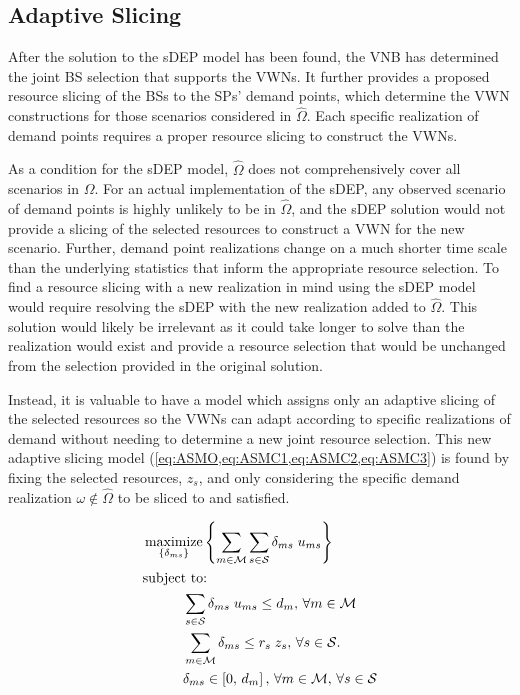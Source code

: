 \documentclass[12pt,dvipsnames]{report}
\DeclareMathOperator*{\argmax}{maximize}
\begin{document}
\subsection{Adaptive Slicing} \label{subsec:dep_slicing}

After the solution to the sDEP model has been found, the VNB has determined the joint BS selection that supports the VWNs.  It further provides a proposed resource slicing of the BSs to the SPs' demand points, which determine the VWN constructions for those scenarios considered in $\hat{\Omega}$.  Each specific realization of demand points requires a proper resource slicing to construct the VWNs.

As a condition for the sDEP model, $\hat{\Omega}$ does not comprehensively cover all scenarios in $\Omega$.  For an actual implementation of the sDEP, any observed scenario of demand points is highly unlikely to be in $\hat{\Omega}$, and the sDEP solution would not provide a slicing of the selected resources to construct a VWN for the new scenario.  Further, demand point realizations change on a much shorter time scale than the underlying statistics that inform the appropriate resource selection.  To find a resource slicing with a new realization in mind using the sDEP model would require resolving the sDEP with the new realization added to $\hat{\Omega}$.  This solution would likely be irrelevant as it could take longer to solve than the realization would exist and provide a resource selection that would be unchanged from the selection provided in the original solution.

Instead, it is valuable to have a model which assigns only an adaptive slicing of the selected resources so the VWNs can adapt according to specific realizations of demand without needing to determine a new joint resource selection.  This new adaptive slicing model (\cref{eq:ASMO,eq:ASMC1,eq:ASMC2,eq:ASMC3}) is found by fixing the selected resources, $z_s$, and only considering the specific demand realization $\omega \notin \hat{\Omega}$ to be sliced to and satisfied.

\begin{tcolorbox}[floatplacement = ht, float, title = Adaptive Slicing Model]
	\begin{align}
		& \argmax_{\left\{ \delta_{ms} \right\}} \left\{ \sum_{m \in \mathcal{M}} \sum_{s \in \mathcal{S}} \delta_{ms} \; u_{ms} \right\} \label{eq:ASMO}\\
		& \text{subject to:}  \nonumber \\
		& \hspace{0.4in} \sum_{s \in \mathcal{S}} \delta_{ms} \; u_{ms} \leq d_m,\, \forall m \in \mathcal{M} \label{eq:ASMC1}\\
		& \hspace{0.4in} \sum_{m \in \mathcal{M}} \delta_{ms} \leq r_s \; z_s,\, \forall s \in \mathcal{S}. \label{eq:ASMC2}\\
		& \hspace{0.4in} \delta_{ms} \in \left[ 0,\, d_m \right],\, \forall m \in \mathcal{M},\, \forall s \in \mathcal{S} \label{eq:ASMC3}
	\end{align}
\end{tcolorbox}
\end{document}
